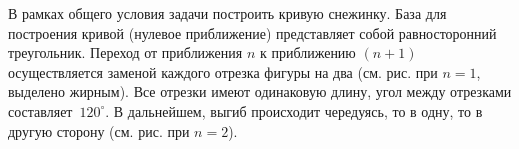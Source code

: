 
\begin{zztask}
В рамках общего условия задачи построить кривую снежинку. База для построения
кривой (нулевое приближение) представляет собой равносторонний треугольник.
Переход от приближения
$n$ к приближению $(n+1)$ осуществляется заменой каждого отрезка фигуры на два
(см. рис. при $n=1$, выделено жирным). Все отрезки
имеют одинаковую длину, угол между отрезками \mbox{составляет $120^\circ$}.
В дальнейшем, выгиб происходит чередуясь, то в одну, то в другую сторону 
(см. рис. при $n=2$).
\par
\end{zztask}


